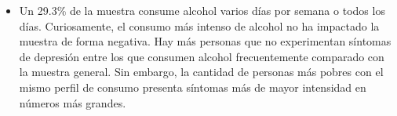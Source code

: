 \documentclass{report}
\begin{document}
\begin{itemize}
\item Un 29.3\% de la muestra consume alcohol varios días por semana o todos los días. Curiosamente, el consumo más intenso de alcohol no ha impactado la muestra de forma negativa. Hay más personas que no experimentan síntomas de depresión entre los que consumen alcohol frecuentemente comparado con la muestra general. Sin embargo, la cantidad de personas más pobres con el mismo perfil de consumo presenta síntomas más de mayor intensidad en números más grandes.
\end{itemize}
\end{document}
